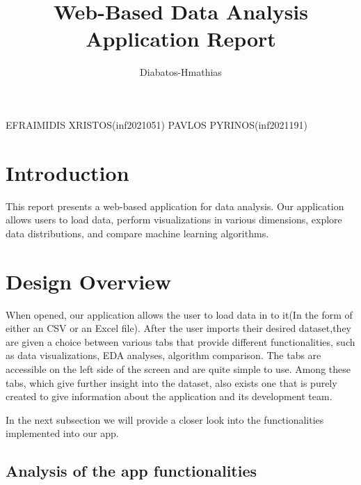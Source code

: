 \documentclass{article}
\title{Web-Based Data Analysis Application Report}
\author{Diabatos-Hmathias}
\begin{document}
\maketitle
EFRAIMIDIS XRISTOS(inf2021051)
PAVLOS PYRINOS(inf2021191)
\section{Introduction}
This report presents a web-based application for data analysis. Our application allows users to load data, perform visualizations in various dimensions, explore data distributions, and compare machine learning algorithms.

\section{Design Overview}
When opened, our application allows the user to load data in to it(In the form of either an CSV or an Excel file). After the user imports their desired dataset,they are given a choice between various tabs that provide different functionalities, such as data visualizations, EDA analyses, algorithm comparison. The tabs are accessible on the left side of the screen and are quite simple to use. Among these tabs, which give further insight into the dataset, also exists one that is purely created to give information about the application and its development team.   

In the next subsection we will provide a closer look into the functionalities implemented into our app.

\subsection{Analysis of the app functionalities}
\end{document}
